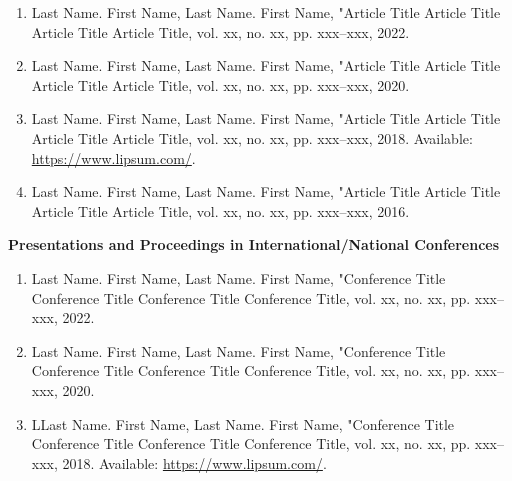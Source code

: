 \documentclass{article}
\begin{document}
\begin{enumerate}
    \item Last Name. First Name, Last Name. First Name, "Article Title Article Title Article Title Article Title, vol. xx, no. xx, pp. xxx–xxx, 2022.

    \item Last Name. First Name, Last Name. First Name, "Article Title Article Title Article Title Article Title, vol. xx, no. xx, pp. xxx–xxx, 2020.
    
    \item Last Name. First Name, Last Name. First Name, "Article Title Article Title Article Title Article Title, vol. xx, no. xx, pp. xxx–xxx, 2018. Available: \url{https://www.lipsum.com/}.

    \item Last Name. First Name, Last Name. First Name, "Article Title Article Title Article Title Article Title, vol. xx, no. xx, pp. xxx–xxx, 2016.
\end{enumerate} 


\textbf{Presentations and Proceedings in International/National Conferences}

\begin{enumerate}
    \item Last Name. First Name, Last Name. First Name, "Conference Title Conference Title Conference Title Conference Title, vol. xx, no. xx, pp. xxx–xxx, 2022.

    \item Last Name. First Name, Last Name. First Name, "Conference Title Conference Title Conference Title Conference Title, vol. xx, no. xx, pp. xxx–xxx, 2020.
    
    \item LLast Name. First Name, Last Name. First Name, "Conference Title Conference Title Conference Title Conference Title, vol. xx, no. xx, pp. xxx–xxx, 2018. Available: \url{https://www.lipsum.com/}.
\end{enumerate}
   
   
\end{document}
